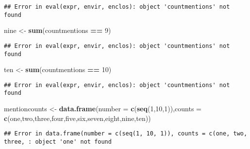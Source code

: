 \documentclass[]{article}
\newenvironment{Shaded}{\begin{snugshade}}{\end{snugshade}}
\newcommand{\KeywordTok}[1]{\textcolor[rgb]{0.13,0.29,0.53}{\textbf{#1}}}
\newcommand{\DataTypeTok}[1]{\textcolor[rgb]{0.13,0.29,0.53}{#1}}
\newcommand{\DecValTok}[1]{\textcolor[rgb]{0.00,0.00,0.81}{#1}}
\newcommand{\StringTok}[1]{\textcolor[rgb]{0.31,0.60,0.02}{#1}}
\newcommand{\OperatorTok}[1]{\textcolor[rgb]{0.81,0.36,0.00}{\textbf{#1}}}
\newcommand{\NormalTok}[1]{#1}
\begin{document}
\begin{verbatim}
## Error in eval(expr, envir, enclos): object 'countmentions' not found
\end{verbatim}

\begin{Shaded}
\begin{Highlighting}[]
\NormalTok{nine <-}\StringTok{ }\KeywordTok{sum}\NormalTok{(countmentions }\OperatorTok{==}\StringTok{ }\DecValTok{9}\NormalTok{)}
\end{Highlighting}
\end{Shaded}

\begin{verbatim}
## Error in eval(expr, envir, enclos): object 'countmentions' not found
\end{verbatim}

\begin{Shaded}
\begin{Highlighting}[]
\NormalTok{ten <-}\StringTok{ }\KeywordTok{sum}\NormalTok{(countmentions }\OperatorTok{==}\StringTok{ }\DecValTok{10}\NormalTok{)}
\end{Highlighting}
\end{Shaded}

\begin{verbatim}
## Error in eval(expr, envir, enclos): object 'countmentions' not found
\end{verbatim}

\begin{Shaded}
\begin{Highlighting}[]
\NormalTok{mentioncounts <-}\StringTok{ }\KeywordTok{data.frame}\NormalTok{(}\DataTypeTok{number =} \KeywordTok{c}\NormalTok{(}\KeywordTok{seq}\NormalTok{(}\DecValTok{1}\NormalTok{,}\DecValTok{10}\NormalTok{,}\DecValTok{1}\NormalTok{)),}\DataTypeTok{counts =} \KeywordTok{c}\NormalTok{(one,two,three,four,five,six,seven,eight,nine,ten))}
\end{Highlighting}
\end{Shaded}

\begin{verbatim}
## Error in data.frame(number = c(seq(1, 10, 1)), counts = c(one, two, three, : object 'one' not found
\end{verbatim}

\begin{Shaded}
\end{Shaded}
\end{document}
